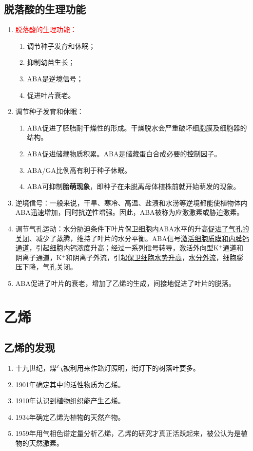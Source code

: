 \subsection{脱落酸的生理功能}
\begin{enumerate}
    \item \textcolor{red}{脱落酸的生理功能：}
    \begin{enumerate}
        \item 调节种子发育和休眠；
        \item 抑制幼苗生长；
        \item ABA是逆境信号；
        \item 促进叶片衰老。
    \end{enumerate}
    \item 调节种子发育和休眠：
    \begin{enumerate}
        \item ABA促进了胚胎耐干燥性的形成。干燥脱水会严重破坏细胞膜及细胞器的结构。
        \item ABA促进储藏物质积累。ABA是储藏蛋白合成必要的控制因子。
        \item ABA/GA比例高有利于种子休眠。
        \item ABA可抑制\textbf{胎萌现象}，即种子在未脱离母体植株前就开始萌发的现象。
    \end{enumerate}
    \item 逆境信号：一般来说，干旱、寒冷、高温、盐渍和水涝等逆境都能使植物体内ABA迅速增加，同时抗逆性增强。因此，ABA被称为应激激素或胁迫激素。
    \item 调节气孔运动：水分胁迫条件下叶片保卫细胞内ABA水平的升高\uline{促进了气孔的关闭}、减少了蒸腾，维持了叶片的水分平衡。ABA信号\uline{激活细胞质膜和内膜钙通道}，引起细胞内钙浓度升高；经过一系列信号转导，激活外向型K$^+$通道和阴离子通道，K$^+$和阴离子外流，引起\uline{保卫细胞水势升高}，\uline{水分外流}，细胞膨压下降，气孔关闭。
    \item ABA促进了叶片的衰老，增加了乙烯的生成，间接地促进了叶片的脱落。 
\end{enumerate}

\section{乙烯}
\subsection{乙烯的发现}
\begin{enumerate}
    \item 十九世纪，煤气被利用来作路灯照明，街灯下的树落叶要多。
    \item 1901年确定其中的活性物质为乙烯。
    \item 1910年认识到植物组织能产生乙烯。
    \item 1934年确定乙烯为植物的天然产物。
    \item 1959年用气相色谱定量分析乙烯，乙烯的研究才真正活跃起来，被公认为是植物的天然激素。    
\end{enumerate}
